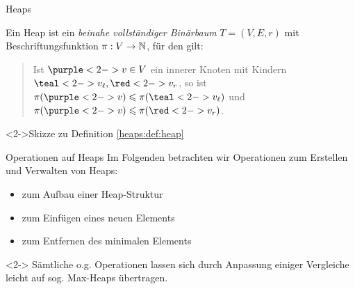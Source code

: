 \begin{frame}{Heaps}
\begin{definition}\label{heaps:def:heap}\vspace*{-6pt}
Ein \alert{Heap} ist ein \emph{beinahe vollst\"andiger Bin\"arbaum} $T = (V, E, r)$ mit Beschriftungsfunktion $\pi: V \to \mathbb{N}$, f\"ur den gilt:
\begin{quote}
    Ist $\purple<2->{v} \in V$ ein innerer Knoten mit Kindern $\teal<2->{v_{\ell}}, \red<2->{v_r}$, so ist $\pi(\purple<2->{v}) \leq \pi(\teal<2->{v_{\ell}})$ und $\pi(\purple<2->{v}) \leq \pi(\red<2->{v_r})$.
\end{quote}
\end{definition}

\begin{block}<2->{Skizze zu Definition \ref{heaps:def:heap}}
\end{block}
\end{frame}

\begin{frame}{Operationen auf Heaps}
Im Folgenden betrachten wir Operationen zum Erstellen und Verwalten von Heaps:
\begin{itemize}
    \item {} zum Aufbau einer Heap-Struktur
    \item {} zum Einf\"ugen eines neuen Elements
    \item {} zum Entfernen des minimalen Elements
\end{itemize}

\begin{remark}<2->
S\"amtliche o.g. Operationen lassen sich durch Anpassung einiger Vergleiche leicht auf sog. Max-Heaps \"ubertragen.
\end{remark}
\end{frame}

